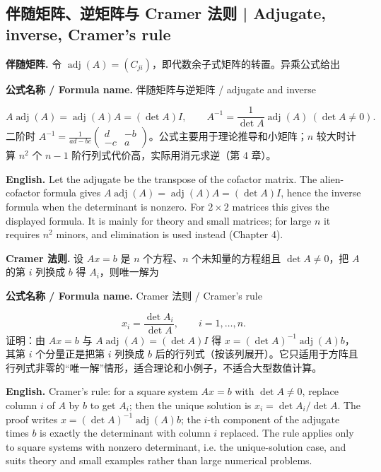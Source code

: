 \documentclass[UTF8,11pt,a4paper]{ctexart}
\newcommand{\EN}[1]{\par\noindent\textbf{English.} #1\par}
\newcommand{\FORMULA}[2]{\par\noindent\textbf{公式名称 / Formula name.} #1 / #2\par}
\begin{document}
\subsection{伴随矩阵、逆矩阵与 Cramer 法则 | Adjugate, inverse, Cramer's rule}
\noindent\textbf{伴随矩阵.} 令 $\operatorname{adj}(A)=(C_{ji})$，即代数余子式矩阵的转置。异乘公式给出
\FORMULA{伴随矩阵与逆矩阵}{adjugate and inverse}
\[
A\operatorname{adj}(A)=\operatorname{adj}(A)A=(\det A)I,\qquad
A^{-1}=\frac{1}{\det A}\operatorname{adj}(A)\ (\det A\ne0).
\]
二阶时 $A^{-1}=\frac{1}{ad-bc}\begin{pmatrix}d&-b\\-c&a\end{pmatrix}$。公式主要用于理论推导和小矩阵；$n$ 较大时计算 $n^2$ 个 $n-1$ 阶行列式代价高，实际用消元求逆（第 4 章）。
\EN{Let the adjugate be the transpose of the cofactor matrix. The alien-cofactor formula gives $A\operatorname{adj}(A)=\operatorname{adj}(A)A=(\det A)I$, hence the inverse formula when the determinant is nonzero. For $2\times2$ matrices this gives the displayed formula. It is mainly for theory and small matrices; for large $n$ it requires $n^2$ minors, and elimination is used instead (Chapter 4).}
\noindent\textbf{Cramer 法则.} 设 $Ax=b$ 是 $n$ 个方程、$n$ 个未知量的方程组且 $\det A\ne0$，把 $A$ 的第 $i$ 列换成 $b$ 得 $A_i$，则唯一解为
\FORMULA{Cramer 法则}{Cramer's rule}
\[
x_i=\frac{\det A_i}{\det A},\qquad i=1,\dots,n.
\]
证明：由 $Ax=b$ 与 $A\operatorname{adj}(A)=(\det A)I$ 得 $x=(\det A)^{-1}\operatorname{adj}(A)b$，其第 $i$ 个分量正是把第 $i$ 列换成 $b$ 后的行列式（按该列展开）。它只适用于方阵且行列式非零的“唯一解”情形，适合理论和小例子，不适合大型数值计算。
\EN{Cramer's rule: for a square system $Ax=b$ with $\det A\ne0$, replace column $i$ of $A$ by $b$ to get $A_i$; then the unique solution is $x_i=\det A_i/\det A$. The proof writes $x=(\det A)^{-1}\operatorname{adj}(A)b$; the $i$-th component of the adjugate times $b$ is exactly the determinant with column $i$ replaced. The rule applies only to square systems with nonzero determinant, i.e. the unique-solution case, and suits theory and small examples rather than large numerical problems.}
\end{document}
